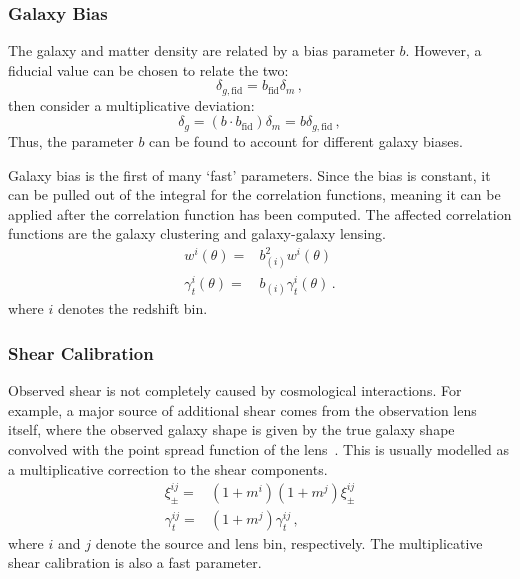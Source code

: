 \subsubsection{Galaxy Bias}
The galaxy and matter density are related by a bias parameter $b$. However, a fiducial value can be chosen to relate the two:
\begin{equation}
	\delta_{g,\text{fid}} = b_{\text{fid}}\delta_m\,,
\end{equation}
then consider a multiplicative deviation:
\begin{equation}
	\delta_g = (b\cdot b_{\text{fid}})\delta_m = b\delta_{g,\text{fid}}\,,
\end{equation}
Thus, the parameter $b$ can be found to account for different galaxy biases. 

Galaxy bias is the first of many `fast' parameters. Since the bias is constant, it can be pulled out of the integral for the correlation functions, meaning it can be applied after the correlation function has been computed. The affected correlation functions are the galaxy clustering and galaxy-galaxy lensing.
\begin{equation}
	\begin{split}
		w^i(\theta) =& b_{(i)}^2w^i(\theta) \\
		\gamma^i_t(\theta) =& b_{(i)}\gamma_t^i(\theta)\,.
	\end{split}
\end{equation}
where $i$ denotes the redshift bin.
\subsubsection{Shear Calibration}
Observed shear is not completely caused by cosmological interactions. For example, a major source of additional shear comes from the observation lens itself, where the observed galaxy shape is given by the true galaxy shape convolved with the point spread function of the lens~\cite{hirata_shear_2003,gillis_effects_2019}. This is usually modelled as a multiplicative correction to the shear components.
\begin{equation}
	\begin{split}
		\xi^{ij}_{\pm} =& (1+m^i)(1+m^j) \xi^{ij}_{\pm} \\
		\gamma^{ij}_t =& (1+m^j) \gamma_t^{ij}\,,
	\end{split}
\end{equation}
where $i$ and $j$ denote the source and lens bin, respectively. The multiplicative shear calibration is also a fast parameter.
